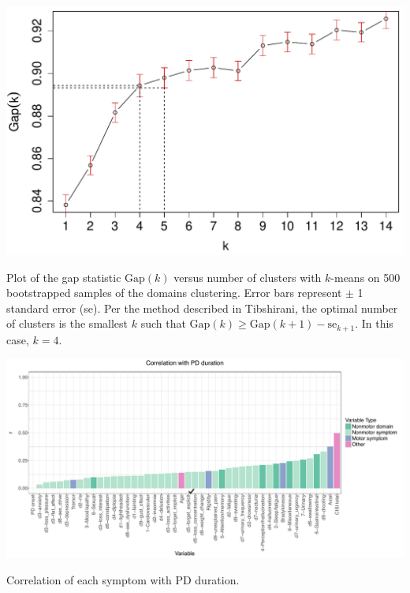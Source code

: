 \documentclass[preprint,5p]{elsarticle} %
\begin{document}
\begin{suppfigure}[h]
  \centering
  \includegraphics[width=\linewidth]{gap-statistic.pdf}
  \caption{Plot of the gap statistic $\text{Gap}(k)$ versus number of clusters with $k$-means on
  500 bootstrapped samples of the domains clustering. Error bars represent $\pm$ 1 standard error
  (se). Per the method described in Tibshirani,\cite{tibshirani01gap} the optimal number of
  clusters is the smallest $k$ such that $\text{Gap}(k) \geq \text{Gap}(k + 1) - \text{se}_{k +
  1}$. In this case, $k = 4$.}
  \label{fig:gap}
\end{suppfigure}

\begin{suppfigure*}[p]
  \centering
  \includegraphics[width=\linewidth]{cor-unbinned.pdf}
  \caption{Correlation of each symptom with PD duration.}
  \label{fig:corr}
\end{suppfigure*}
\end{document}
